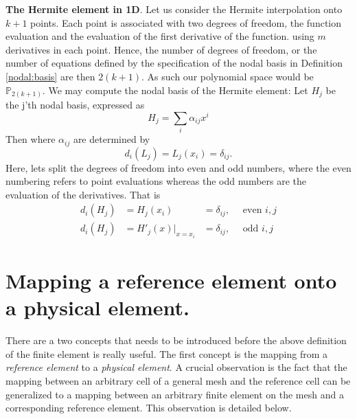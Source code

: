 \begin{exmp}{\textbf{The Hermite element in 1D}.} 
\label{hermite:element}
Let us consider the Hermite interpolation onto $k+1$ points.  
Each point is associated with two degrees of freedom, the function evaluation and the evaluation of the first 
derivative of the function.  
using $m$ derivatives in each point. Hence,  
the number of degrees of freedom, or the number of equations defined by the specification of the nodal 
basis in Definition \ref{nodal:basis} are then $2(k+1)$. As such our polynomial space would be $\mathbb{P}_{2(k+1)}$.    
We may compute the nodal basis of the Hermite element: 
Let $H_j$ be the j'th nodal basis, expressed as  
\[ 
H_j = \sum_i \alpha_{ij} x^i 
\]
Then 
where $\alpha_{ij}$ are determined by 
\[ 
d_i(L_j) = L_j(x_i) = \delta_{ij} . 
\]
Here, lets split the degrees of freedom into even and odd numbers, where the even numbering refers to 
point evaluations whereas the odd numbers are the evaluation of the derivatives. 
That is 
\begin{align*} 
d_i(H_j) &= H_j(x_i)  &=  \delta_{ij}, \quad \mbox{ even } i,j   \\
d_i(H_j) &= H'_j(x) |_{x=x_i} &= \delta_{ij}, \quad \mbox{ odd } i,j  
\end{align*}

\end{exmp}


\section{Mapping a reference element onto a physical element. }

There are a two concepts that needs to be introduced before the above definition of the finite element is really useful.
The first concept is the mapping from a \emph{reference element} to a \emph{physical element}. 
A crucial observation is the fact that the mapping between an arbitrary cell of a general mesh and the reference cell can be generalized to 
a mapping between an arbitrary finite element on the mesh and a corresponding reference element.  
This observation is detailed below. 

